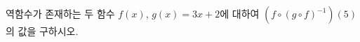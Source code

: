 \hspace*{2mm}\begin{minipage}[t]{\dimexpr\linewidth-2mm\relax}\vspace{0pt}
역함수가 존재하는 두 함수 $f(x)$, $g(x)=3x+2$에 대하여 $(f\circ(g\circ f)^{-1})(5)$의 값을 구하시오.\end{minipage}
